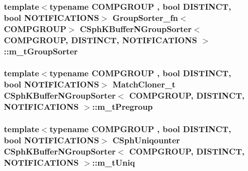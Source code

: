 \hypertarget{classCSphKBufferNGroupSorter_a145142e70a48058d82965c6a5aa658b5}{
\subsubsection[{m\-\_\-t\-Group\-Sorter}]{\setlength{\rightskip}{0pt plus 5cm}template$<$typename C\-O\-M\-P\-G\-R\-O\-U\-P , bool D\-I\-S\-T\-I\-N\-C\-T, bool N\-O\-T\-I\-F\-I\-C\-A\-T\-I\-O\-N\-S$>$ {\bf Group\-Sorter\-\_\-fn}$<$C\-O\-M\-P\-G\-R\-O\-U\-P$>$ {\bf C\-Sph\-K\-Buffer\-N\-Group\-Sorter}$<$ C\-O\-M\-P\-G\-R\-O\-U\-P, D\-I\-S\-T\-I\-N\-C\-T, N\-O\-T\-I\-F\-I\-C\-A\-T\-I\-O\-N\-S $>$\-::m\-\_\-t\-Group\-Sorter\hspace{0.3cm}{\ttfamily [protected]}}}\label{classCSphKBufferNGroupSorter_a145142e70a48058d82965c6a5aa658b5}
\hypertarget{classCSphKBufferNGroupSorter_a3122bd4d25253d184cdacee1edee78d7}{
\subsubsection[{m\-\_\-t\-Pregroup}]{\setlength{\rightskip}{0pt plus 5cm}template$<$typename C\-O\-M\-P\-G\-R\-O\-U\-P , bool D\-I\-S\-T\-I\-N\-C\-T, bool N\-O\-T\-I\-F\-I\-C\-A\-T\-I\-O\-N\-S$>$ {\bf Match\-Cloner\-\_\-t} {\bf C\-Sph\-K\-Buffer\-N\-Group\-Sorter}$<$ C\-O\-M\-P\-G\-R\-O\-U\-P, D\-I\-S\-T\-I\-N\-C\-T, N\-O\-T\-I\-F\-I\-C\-A\-T\-I\-O\-N\-S $>$\-::m\-\_\-t\-Pregroup\hspace{0.3cm}{\ttfamily [protected]}}}\label{classCSphKBufferNGroupSorter_a3122bd4d25253d184cdacee1edee78d7}
\hypertarget{classCSphKBufferNGroupSorter_a2c96c192b433c998ddff586219fbd0a7}{
\subsubsection[{m\-\_\-t\-Uniq}]{\setlength{\rightskip}{0pt plus 5cm}template$<$typename C\-O\-M\-P\-G\-R\-O\-U\-P , bool D\-I\-S\-T\-I\-N\-C\-T, bool N\-O\-T\-I\-F\-I\-C\-A\-T\-I\-O\-N\-S$>$ {\bf C\-Sph\-Uniqounter} {\bf C\-Sph\-K\-Buffer\-N\-Group\-Sorter}$<$ C\-O\-M\-P\-G\-R\-O\-U\-P, D\-I\-S\-T\-I\-N\-C\-T, N\-O\-T\-I\-F\-I\-C\-A\-T\-I\-O\-N\-S $>$\-::m\-\_\-t\-Uniq\hspace{0.3cm}{\ttfamily [protected]}}}\label{classCSphKBufferNGroupSorter_a2c96c192b433c998ddff586219fbd0a7}
